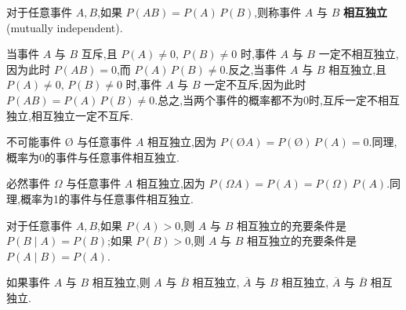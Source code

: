 \begin{definition}
    \indent 对于任意事件 $A,B$,如果 $P(AB) = P(A) \, P(B)$,则称事件 $A$ 与 $B$ \textbf{相互独立}(mutually independent).
\end{definition}

\begin{note}
    \indent 当事件 $A$ 与 $B$ 互斥,且 $P(A) \not= 0, \, P(B) \not= 0$ 时,事件 $A$ 与 $B$ 一定不相互独立,因为此时 $P(AB) = 0$,而 $P(A) \, P(B) \not= 0$.反之,当事件 $A$ 与 $B$ 相互独立,且 $P(A) \not= 0, \, P(B) \not= 0$ 时,事件 $A$ 与 $B$ 一定不互斥,因为此时 $P(AB) = P(A) \, P(B) \not= 0$.总之,当两个事件的概率都不为0时,互斥一定不相互独立,相互独立一定不互斥.

    不可能事件 $\text{\O}$ 与任意事件 $A$ 相互独立,因为 $P(\text{\O} A) = P(\text{\O}) \, P(A) = 0$.同理,概率为0的事件与任意事件相互独立.

    必然事件 $\varOmega$ 与任意事件 $A$ 相互独立,因为 $P(\varOmega A) = P(A) = P(\varOmega) \, P(A)$.同理,概率为1的事件与任意事件相互独立.
\end{note}

\begin{conclusion}
    \indent 对于任意事件 $A,B$,如果 $P(A) > 0$,则 $A$ 与 $B$ 相互独立的充要条件是 $P(B \mid A) = P(B)$;如果 $P(B) > 0$,则 $A$ 与 $B$ 相互独立的充要条件是 $P(A \mid B) = P(A)$.
\end{conclusion}

\begin{conclusion}
    \indent 如果事件 $A$ 与 $B$ 相互独立,则 $A$ 与 $\overline{B}$ 相互独立, $\overline{A}$ 与 $B$ 相互独立, $\overline{A}$ 与 $\overline{B}$ 相互独立.
\end{conclusion}

